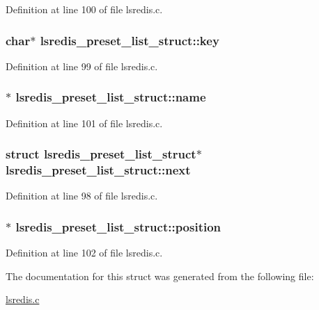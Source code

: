 Definition at line 100 of file lsredis.\-c.

\hypertarget{structlsredis__preset__list__struct_ab3a50b52cf845fa70667d8be9ea7d73b}{
\subsubsection[{key}]{\setlength{\rightskip}{0pt plus 5cm}char$\ast$ lsredis\-\_\-preset\-\_\-list\-\_\-struct\-::key}}\label{structlsredis__preset__list__struct_ab3a50b52cf845fa70667d8be9ea7d73b}


Definition at line 99 of file lsredis.\-c.

\hypertarget{structlsredis__preset__list__struct_a285a79dd419ae70c5b75ef57914d3331}{
\subsubsection[{name}]{$\ast$ lsredis\-\_\-preset\-\_\-list\-\_\-struct\-::name}}\label{structlsredis__preset__list__struct_a285a79dd419ae70c5b75ef57914d3331}


Definition at line 101 of file lsredis.\-c.

\hypertarget{structlsredis__preset__list__struct_a14422c8bfa270e5620c66be871091f67}{
\subsubsection[{next}]{\setlength{\rightskip}{0pt plus 5cm}struct {\bf lsredis\-\_\-preset\-\_\-list\-\_\-struct}$\ast$ lsredis\-\_\-preset\-\_\-list\-\_\-struct\-::next}}\label{structlsredis__preset__list__struct_a14422c8bfa270e5620c66be871091f67}


Definition at line 98 of file lsredis.\-c.

\hypertarget{structlsredis__preset__list__struct_ae365a576448adeccb66fbb85cfcf4b23}{
\subsubsection[{position}]{$\ast$ lsredis\-\_\-preset\-\_\-list\-\_\-struct\-::position}}\label{structlsredis__preset__list__struct_ae365a576448adeccb66fbb85cfcf4b23}


Definition at line 102 of file lsredis.\-c.



The documentation for this struct was generated from the following file\-:\begin{DoxyCompactItemize}
\item 
\hyperlink{lsredis_8c}{lsredis.\-c}\end{DoxyCompactItemize}

